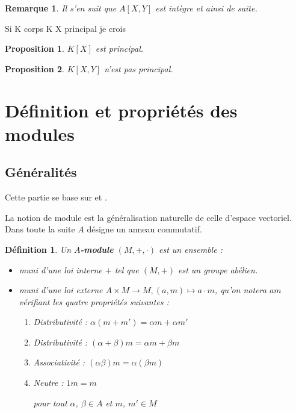 \documentclass[a4paper,12pt]{report}  %
\theoremstyle{definitionstyle}
\newtheorem{definition}{Définition}[chapter] %
\theoremstyle{examplestyle}
\theoremstyle{remarkstyle}
\newtheorem{remark}{Remarque}[chapter] %
\theoremstyle{propositionstyle}
\newtheorem{proposition}{Proposition}[chapter]  %
\theoremstyle{theoremstyle}
\theoremstyle{proofstyle}
\begin{document}
	\begin{remark}
		Il s'en suit que $A[X, Y]$ est intègre et ainsi de suite.
	\end{remark}

	Si K corps K X principal je crois
	
	\begin{proposition}
		$K[X]$ est principal.
	\end{proposition}

	\begin{proposition}
		$K[X, Y]$ n'est pas principal.
	\end{proposition}
	
	\section{Définition et propriétés des modules} %
	
	\subsection{Généralités}
	Cette partie se base sur \cite{ring_modules} et \cite{harari_modules}.
	
	La notion de module est la généralisation naturelle de celle d'espace vectoriel. Dans toute la suite $A$ désigne un anneau commutatif.
	
	\begin{definition}
		Un \textbf{$A$-module} $(M, +, \cdot)$ est un ensemble :
		
		\begin{itemize}
			\item muni d'une loi interne $+$ tel que $(M, +)$ est un groupe abélien.
			\item muni d'une loi externe $A \times M \rightarrow M, (a, m) \mapsto a \cdot m$, qu'on notera $am$ vérifiant les quatre propriétés suivantes :
			\begin{enumerate}
				\item Distributivité : $\alpha(m + m') = \alpha m + \alpha m'$
				\item Distributivité : $(\alpha+\beta)m = \alpha m + \beta m$
				\item Associativité : $(\alpha \beta)m = \alpha(\beta m)$
				\item Neutre : $1m = m$
				
				pour tout $\alpha$, $\beta \in A$ et $m$, $m' \in M$
			\end{enumerate}
		\end{itemize}
	\end{definition}
	
\end{document}

